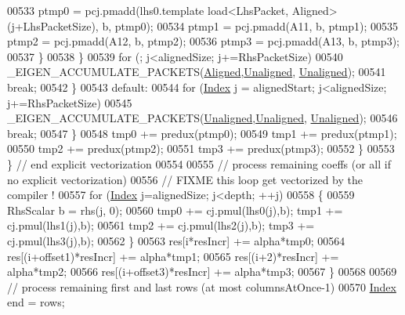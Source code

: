 \begin{DoxyCode}
{{00533                 ptmp0 = pcj.pmadd(lhs0.template load<LhsPacket, Aligned>(j+LhsPacketSize), b, ptmp0);
00534                 ptmp1 = pcj.pmadd(A11, b, ptmp1);
00535                 ptmp2 = pcj.pmadd(A12, b, ptmp2);
00536                 ptmp3 = pcj.pmadd(A13, b, ptmp3);
00537               \}
00538             \}
00539             \textcolor{keywordflow}{for} (; j<alignedSize; j+=RhsPacketSize)
00540               \_EIGEN\_ACCUMULATE\_PACKETS(\hyperlink{group__enums_gga45fe06e29902b7a2773de05ba27b47a1ad37d4c71425bb286e9b4103830538fbf}{Aligned},\hyperlink{group__enums_gga45fe06e29902b7a2773de05ba27b47a1ac935220b4c844108e183ebe30a4d5204}{Unaligned},
      \hyperlink{group__enums_gga45fe06e29902b7a2773de05ba27b47a1ac935220b4c844108e183ebe30a4d5204}{Unaligned});
00541             \textcolor{keywordflow}{break};
00542           \}
00543           \textcolor{keywordflow}{default}:
00544             \textcolor{keywordflow}{for} (\hyperlink{namespace_eigen_a62e77e0933482dafde8fe197d9a2cfde}{Index} j = alignedStart; j<alignedSize; j+=RhsPacketSize)
00545               \_EIGEN\_ACCUMULATE\_PACKETS(\hyperlink{group__enums_gga45fe06e29902b7a2773de05ba27b47a1ac935220b4c844108e183ebe30a4d5204}{Unaligned},\hyperlink{group__enums_gga45fe06e29902b7a2773de05ba27b47a1ac935220b4c844108e183ebe30a4d5204}{Unaligned},
      \hyperlink{group__enums_gga45fe06e29902b7a2773de05ba27b47a1ac935220b4c844108e183ebe30a4d5204}{Unaligned});
00546             \textcolor{keywordflow}{break};
00547         \}
00548         tmp0 += predux(ptmp0);
00549         tmp1 += predux(ptmp1);
00550         tmp2 += predux(ptmp2);
00551         tmp3 += predux(ptmp3);
00552       \}
00553     \} \textcolor{comment}{// end explicit vectorization}
00554 
00555     \textcolor{comment}{// process remaining coeffs (or all if no explicit vectorization)}
00556     \textcolor{comment}{// FIXME this loop get vectorized by the compiler !}
00557     \textcolor{keywordflow}{for} (\hyperlink{namespace_eigen_a62e77e0933482dafde8fe197d9a2cfde}{Index} j=alignedSize; j<depth; ++j)
00558     \{
00559       RhsScalar b = rhs(j, 0);
00560       tmp0 += cj.pmul(lhs0(j),b); tmp1 += cj.pmul(lhs1(j),b);
00561       tmp2 += cj.pmul(lhs2(j),b); tmp3 += cj.pmul(lhs3(j),b);
00562     \}
00563     res[i*resIncr]            += alpha*tmp0;
00564     res[(i+offset1)*resIncr]  += alpha*tmp1;
00565     res[(i+2)*resIncr]        += alpha*tmp2;
00566     res[(i+offset3)*resIncr]  += alpha*tmp3;
00567   \}
00568 
00569   \textcolor{comment}{// process remaining first and last rows (at most columnsAtOnce-1)}
00570   \hyperlink{namespace_eigen_a62e77e0933482dafde8fe197d9a2cfde}{Index} end = rows;
}}
\end{DoxyCode}
